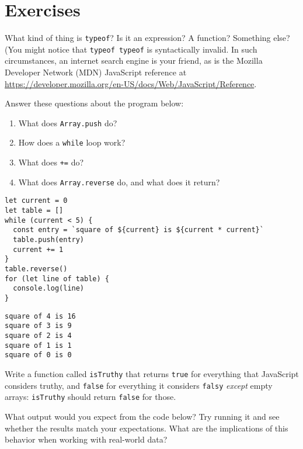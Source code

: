 \section{Exercises}\label{s:basics-exercises}


What kind of thing is \texttt{typeof}?
Is it an expression?
A function?
Something else?
(You might notice that \texttt{typeof\ typeof} is syntactically invalid.
In such circumstances,
an internet search engine is your friend,
as is the Mozilla Developer Network (MDN) JavaScript reference
at \url{https://developer.mozilla.org/en-US/docs/Web/JavaScript/Reference}.


Answer these questions about the program below:

\begin{enumerate}
\item
  What does \texttt{Array.push} do?
\item
  How does a \texttt{while} loop work?
\item
  What does \texttt{+=} do?
\item
  What does \texttt{Array.reverse} do, and what does it return?
\end{enumerate}

\begin{verbatim}
let current = 0
let table = []
while (current < 5) {
  const entry = `square of ${current} is ${current * current}`
  table.push(entry)
  current += 1
}
table.reverse()
for (let line of table) {
  console.log(line)
}
\end{verbatim}

\begin{verbatim}
square of 4 is 16
square of 3 is 9
square of 2 is 4
square of 1 is 1
square of 0 is 0
\end{verbatim}


Write a function called \texttt{isTruthy} that returns \texttt{true} for everything that JavaScript considers truthy,
and \texttt{false} for everything it considers \texttt{falsy} \emph{except} empty arrays:
\texttt{isTruthy} should return \texttt{false} for those.


What output would you expect from the code below?
Try running it and see whether the results match your expectations.
What are the implications of this behavior when working with real-world data?

